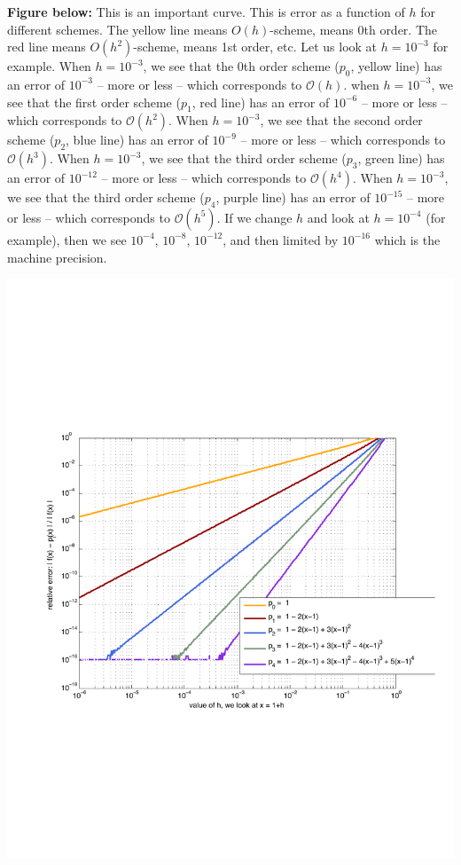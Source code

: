 \documentclass[pdftex,11pt]{article}
\begin{document}
\textbf{Figure below:} This is an important curve. This is error as a function
of $h$ for different schemes. The yellow line means $O(h)$-scheme, means 0th
order. The red line means $O(h^2)$-scheme, means 1st order, etc. Let us look at
$h=10^{-3}$ for example. When $h=10^{-3}$, we see that the 0th order scheme ($p_0$,
yellow line) has an error of $10^{-3}$ -- more or less -- which corresponds to
$\mathcal{O}(h)$.  when $h=10^{-3}$, we see that the first order scheme ($p_1$,
red line) has an error of $10^{-6}$ -- more or less -- which corresponds to
$\mathcal{O}(h^2)$.  When $h=10^{-3}$, we see that the second order scheme ($p_2$,
blue line) has an error of $10^{-9}$ -- more or less -- which corresponds to
$\mathcal{O}(h^3)$.  When $h=10^{-3}$, we see that the third order scheme ($p_3$,
green line) has an error of $10^{-12}$ -- more or less -- which corresponds to
$\mathcal{O}(h^4)$.  When $h=10^{-3}$, we see that the third order scheme ($p_4$,
purple line) has an error of $10^{-15}$ -- more or less -- which corresponds to
$\mathcal{O}(h^5)$.  If we change $h$ and look at $h=10^{-4}$ (for example), then
we see $10^{-4}$, $10^{-8}$, $10^{-12}$, and then limited by $10^{-16}$ which is the
machine precision.

\includegraphics[width=.7\textwidth]{EX_0_5_6_fig5}
\end{document}
